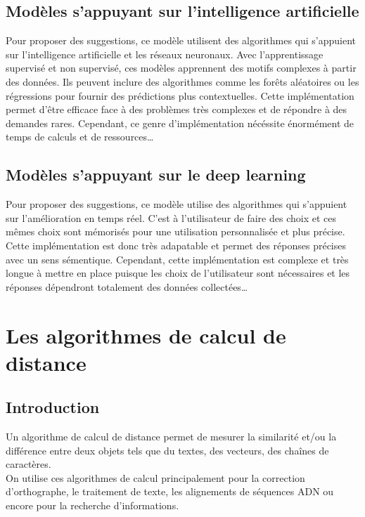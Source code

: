 \documentclass[a4paper, 11pt]{report}
\begin{document}
\section{Modèles s'appuyant sur l'intelligence artificielle}
Pour proposer des suggestions, ce modèle utilisent des algorithmes qui s'appuient sur l'intelligence artificielle et les réseaux neuronaux. 
Avec l’apprentissage supervisé et non supervisé, ces modèles apprennent des motifs complexes à partir des données. Ils peuvent inclure des algorithmes comme les forêts aléatoires ou les régressions pour fournir des prédictions plus contextuelles.
Cette implémentation permet d'être efficace face à des problèmes très complexes et de répondre à des demandes rares. Cependant, ce genre d'implémentation nécéssite énormément de temps de calculs et de ressources\dots
 \newpage

\section{Modèles s'appuyant sur le deep learning}
Pour proposer des suggestions, ce modèle utilise des algorithmes qui s'appuient sur l'amélioration en temps réel. C'est à l'utilisateur de faire des choix et ces mêmes choix sont mémorisés pour une utilisation personnalisée et plus précise. Cette implémentation est donc très adapatable et permet des réponses précises avec un sens sémentique. Cependant, cette implémentation est complexe et très longue à mettre en place puisque les choix de l'utilisateur sont nécessaires et les réponses dépendront totalement des données collectées\dots  



\chapter{Les algorithmes de calcul de distance}

\section{Introduction}

Un algorithme de calcul de distance permet de mesurer la similarité et/ou la différence entre deux objets tels que du textes, des vecteurs, des chaînes de caractères. \\
On utilise ces algorithmes de calcul principalement pour la correction d'orthographe, le traitement de texte, les alignements de séquences ADN ou encore pour la recherche d'informations. \\
\end{document}
